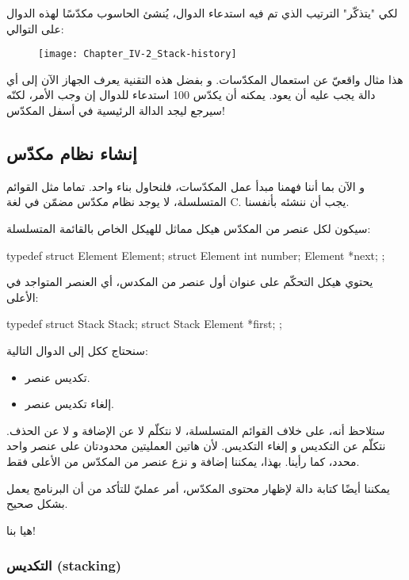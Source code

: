 لكي "يتذكّر" الترتيب الذي تم فيه استدعاء الدوال، يُنشئ الحاسوب مكدّسًا لهذه الدوال على التوالي:

\begin{figure}[H]
	\centering
	\texttt{[image: Chapter\_IV-2\_Stack-history]}
\end{figure}

هذا مثال واقعيّ عن استعمال المكدّسات. و بفضل هذه التقنية يعرف الجهاز الآن إلى أي دالة يجب عليه أن يعود. يمكنه أن يكدّس 100 استدعاء للدوال إن وجب الأمر، لكنّه سيرجع ليجد الدالة الرئيسية في أسفل المكدّس!

\subsection{إنشاء نظام مكدّس}

و الآن بما أننا فهمنا مبدأ عمل المكدّسات، فلنحاول بناء واحد. تماما مثل القوائم المتسلسلة، لا يوجد نظام مكدّس مضمّن في لغة \textenglish{C}.
يجب أن ننشئه بأنفسنا.

سيكون لكل عنصر من المكدّس هيكل مماثل للهيكل الخاص بالقائمة المتسلسلة:

\begin{Csource}
typedef struct Element Element;
struct Element
{
	int number;
	Element *next;
};
\end{Csource}

يحتوي هيكل التحكّم على عنوان أول عنصر من المكدس، أي العنصر المتواجد في الأعلى:

\begin{Csource}
typedef struct Stack Stack;
struct Stack
{
	Element *first;
};
\end{Csource}

سنحتاج ككل إلى الدوال التالية:

\begin{itemize}
	\item تكديس  عنصر.
	\item إلغاء تكديس عنصر.
\end{itemize}

ستلاحظ أنه، على خلاف القوائم المتسلسلة، لا نتكلّم لا عن الإضافة و لا عن الحذف. نتكلّم عن التكديس و إلغاء التكديس. لأن هاتين العمليتين محدودتان على عنصر واحد محدد، كما رأينا. بهذا، يمكننا إضافة و نزع عنصر من المكدّس من الأعلى فقط.

يمكننا أيضًا كتابة دالة لإظهار محتوى المكدّس، أمر عمليّ للتأكد من أن البرنامج يعمل بشكل صحيح.

هيا بنا!

\subsubsection{التكديس (\textenglish{stacking})}

